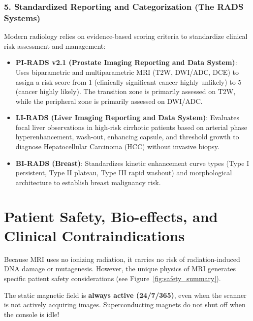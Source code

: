 \documentclass[11pt,a4paper]{article}
\begin{document}
\subsubsection{5. Standardized Reporting and Categorization (The RADS Systems)}
Modern radiology relies on evidence-based scoring criteria to standardize clinical risk assessment and management:
\begin{itemize}
    \item \textbf{PI-RADS v2.1 (Prostate Imaging Reporting and Data System)}: Uses biparametric and multiparametric MRI (T2W, DWI/ADC, DCE) to assign a risk score from 1 (clinically significant cancer highly unlikely) to 5 (cancer highly likely). The transition zone is primarily assessed on T2W, while the peripheral zone is primarily assessed on DWI/ADC.
    \item \textbf{LI-RADS (Liver Imaging Reporting and Data System)}: Evaluates focal liver observations in high-risk cirrhotic patients based on arterial phase hyperenhancement, wash-out, enhancing capsule, and threshold growth to diagnose Hepatocellular Carcinoma (HCC) without invasive biopsy.
    \item \textbf{BI-RADS (Breast)}: Standardizes kinetic enhancement curve types (Type I persistent, Type II plateau, Type III rapid washout) and morphological architecture to establish breast malignancy risk.
\end{itemize}

\section{Patient Safety, Bio-effects, and Clinical Contraindications}

Because MRI uses no ionizing radiation, it carries no risk of radiation-induced DNA damage or mutagenesis. However, the unique physics of MRI generates specific patient safety considerations (see Figure~\ref{fig:safety_summary}).

\begin{mrisafety}
The static magnetic field is \textbf{always active (24/7/365)}, even when the scanner is not actively acquiring images. Superconducting magnets do not shut off when the console is idle!
\end{mrisafety}
\end{document}
